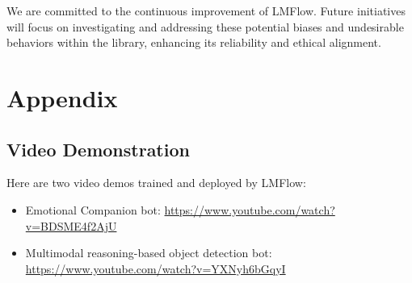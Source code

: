 \documentclass[11pt]{article}
\begin{document}
We are committed to the continuous improvement of LMFlow. 
Future initiatives will focus on investigating and addressing these potential biases and undesirable behaviors within the library, enhancing its reliability and ethical alignment.


%


\appendix

\section{Appendix}
\label{sec:appendix}

\subsection{Video Demonstration}
Here are two video demos trained and deployed by LMFlow:
\begin{itemize}
    \item Emotional Companion bot: \url{https://www.youtube.com/watch?v=BDSME4f2AjU}
    \item Multimodal reasoning-based object detection bot: \url{https://www.youtube.com/watch?v=YXNyh6bGqyI}
\end{itemize}
\end{document}
